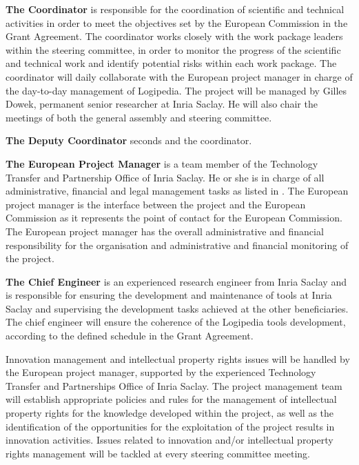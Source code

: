 \begin{compactitem}
\item{\bf The Coordinator} is responsible for the coordination of
scientific and technical activities in order to meet the objectives
set by the European Commission in the Grant Agreement. The 
coordinator works closely with the work package leaders
within the steering committee, in order to monitor the progress of the
scientific and technical work and identify potential risks within each
work package. The coordinator will daily
collaborate with the European project manager in charge of the
day-to-day management of Logipedia. The project will be managed by
Gilles Dowek, permanent senior researcher at Inria Saclay. He will
also chair the meetings of both the general assembly and steering
committee.

\item{\bf The Deputy Coordinator} seconds and the coordinator.

\item{\bf The European Project Manager} 
  is a team member of the Technology Transfer and Partnership Office
  of Inria Saclay. He or she is in charge of all administrative,
  financial and legal management tasks as listed in
  . The European project manager is the interface
  between the project and the European Commission as it represents the
  point of contact for the European Commission. The European project
  manager has the overall administrative and financial responsibility
  for the organisation and administrative and financial monitoring of
  the project.

\item{\bf The Chief Engineer} is an experienced
research engineer from Inria Saclay and is responsible for ensuring
the development and maintenance of tools at Inria Saclay and
supervising the development tasks achieved at the other
beneficiaries. The chief engineer will ensure the coherence of the
Logipedia tools development, according to the defined schedule in the
Grant Agreement.
\end{compactitem}

Innovation management and intellectual property rights issues will be
handled by the European project manager, supported by the experienced
Technology Transfer and Partnerships Office of Inria Saclay. The
project management team will establish appropriate policies and rules
for the management of intellectual property rights for the knowledge
developed within the project, as well as the identification of the
opportunities for the exploitation of the project results in
innovation activities. Issues related to innovation and/or
intellectual property rights management will be tackled at every
steering committee meeting.

